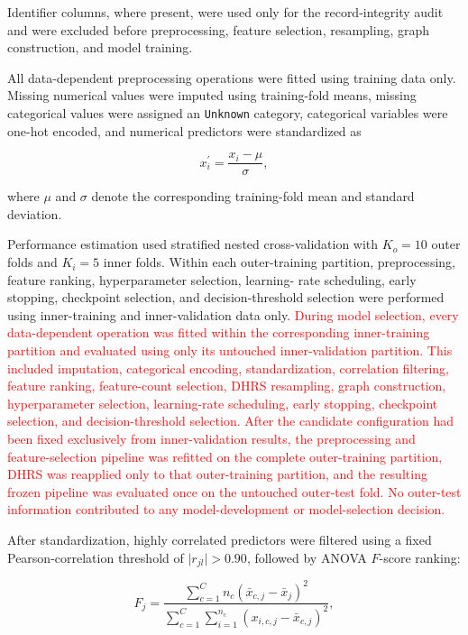 \documentclass[pdflatex,sn-mathphys-num]{sn-jnl}%
\theoremstyle{thmstyleone}%
\theoremstyle{thmstyletwo}%
\theoremstyle{thmstylethree}%
\begin{document}
 {
Identifier columns, where present, were used only for the record-integrity
audit and were excluded before preprocessing, feature selection, resampling,
graph construction, and model training.
}

All data-dependent preprocessing operations were fitted using training data
only. Missing numerical values were imputed using training-fold means,
missing categorical values were assigned an \texttt{Unknown} category,
categorical variables were one-hot encoded, and numerical predictors were
standardized as

\begin{equation}
x_i^{\prime}
=
\frac{x_i-\mu}{\sigma},
\label{eq:zscore_normalization}
\end{equation}

where \(\mu\) and \(\sigma\) denote the corresponding training-fold mean and
standard deviation.


Performance estimation used stratified nested cross-validation with
\(K_o=10\) outer folds and \(K_i=5\) inner folds. Within each outer-training
partition, preprocessing, feature ranking, hyperparameter selection, learning-
rate scheduling, early stopping, checkpoint selection, and decision-threshold
selection were performed using inner-training and inner-validation data only.
\textcolor{red}{
During model selection, every data-dependent operation was fitted within the
corresponding inner-training partition and evaluated using only its untouched
inner-validation partition. This included imputation, categorical encoding,
standardization, correlation filtering, feature ranking, feature-count
selection, DHRS resampling, graph construction, hyperparameter selection,
learning-rate scheduling, early stopping, checkpoint selection, and
decision-threshold selection. After the candidate configuration had been fixed
exclusively from inner-validation results, the preprocessing and
feature-selection pipeline was refitted on the complete outer-training
partition, DHRS was reapplied only to that outer-training partition, and the
resulting frozen pipeline was evaluated once on the untouched outer-test fold.
No outer-test information contributed to any model-development or
model-selection decision.
}


After standardization, highly correlated predictors were filtered using a
fixed Pearson-correlation threshold of
\(\lvert r_{jl}\rvert>0.90\), followed by ANOVA \(F\)-score ranking:

\begin{equation}
F_j
=
\frac{
\sum_{c=1}^{C}
n_c
\left(
\bar{x}_{c,j}-\bar{x}_{j}
\right)^2
}{
\sum_{c=1}^{C}
\sum_{i=1}^{n_c}
\left(
x_{i,c,j}-\bar{x}_{c,j}
\right)^2
},
\label{eq:anova_fscore}
\end{equation}
\end{document}
